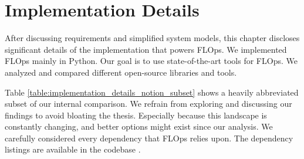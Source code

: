 \chapter{Implementation Details}



After discussing requirements and simplified system models, this chapter discloses significant details of the implementation that powers FLOps.
We implemented FLOps mainly in Python.
Our goal is to use state-of-the-art tools for FLOps.
We analyzed and compared different open-source libraries and tools.

Table \ref{table:implementation_details_notion_subset} shows a heavily abbreviated subset of our internal comparison.
We refrain from exploring and discussing our findings to avoid bloating the thesis.
Especially because this landscape is constantly changing, and better options might exist since our analysis. 
We carefully considered every dependency that FLOps relies upon.
The dependency listings are available in the codebase \cite{flops_code}.















